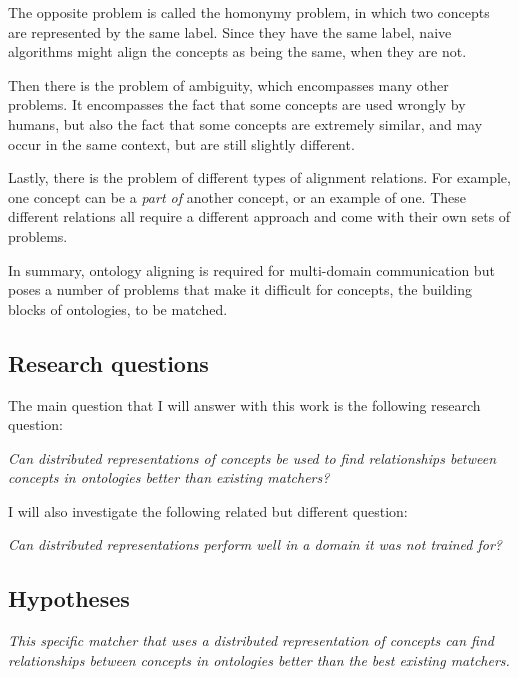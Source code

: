 \documentclass{article}
\begin{document}
 The opposite problem is called the homonymy problem, in which two concepts are represented by the same label. Since they have the same label, naive algorithms might align the concepts as being the same, when they are not.
 
 Then there is the problem of ambiguity, which encompasses many other problems. It encompasses the fact that some concepts are used wrongly by humans, but also the fact that some concepts are extremely similar, and may occur in the same context, but are still slightly different.
 
 Lastly, there is the problem of different types of alignment relations. For example, one concept can be a \emph{part of} another concept, or an example of one. These different relations all require a different approach and come with their own sets of problems. %
 
 In summary, ontology aligning is required for multi-domain communication but poses a number of problems that make it difficult for concepts, the building blocks of ontologies, to be matched.
 
 \subsection{Research questions} \label{researchquestions}
 The main question that I will answer with this work is the following research question:
 
 \begin{center}
 \textit{
 Can distributed representations of concepts be used to find relationships between concepts in ontologies better than existing matchers?
 }
 \end{center}
 
 I will also investigate the following related but different question:
 
 \begin{center}
 \textit{
 Can distributed representations perform well in a domain it was not trained for?
 }
 \end{center}
 
 \subsection{Hypotheses} \label{hypotheses}
 \begin{center}
 \textit{This specific matcher that uses a distributed representation of concepts can find relationships between concepts in ontologies better than the best existing matchers.}
 \end{center}
\end{document}
